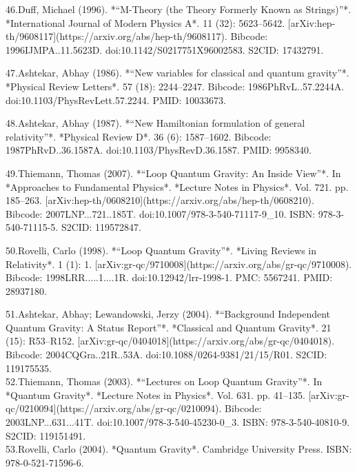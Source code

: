 46.Duff, Michael (1996). *“M-Theory (the Theory Formerly Known as Strings)”*. *International Journal of Modern Physics A*. 11 (32): 5623–5642. [arXiv:hep-th/9608117](https://arxiv.org/abs/hep-th/9608117). Bibcode: 1996IJMPA..11.5623D. doi:10.1142/S0217751X96002583. S2CID: 17432791.

47.Ashtekar, Abhay (1986). *“New variables for classical and quantum gravity”*. *Physical Review Letters*. 57 (18): 2244–2247. Bibcode: 1986PhRvL..57.2244A. doi:10.1103/PhysRevLett.57.2244. PMID: 10033673.

48.Ashtekar, Abhay (1987). *“New Hamiltonian formulation of general relativity”*. *Physical Review D*. 36 (6): 1587–1602. Bibcode: 1987PhRvD..36.1587A. doi:10.1103/PhysRevD.36.1587. PMID: 9958340.

49.Thiemann, Thomas (2007). *“Loop Quantum Gravity: An Inside View”*. In *Approaches to Fundamental Physics*. *Lecture Notes in Physics*. Vol. 721. pp. 185–263. [arXiv:hep-th/0608210](https://arxiv.org/abs/hep-th/0608210). Bibcode: 2007LNP...721..185T. doi:10.1007/978-3-540-71117-9_10. ISBN: 978-3-540-71115-5. S2CID: 119572847.

50.Rovelli, Carlo (1998). *“Loop Quantum Gravity”*. *Living Reviews in Relativity*. 1 (1): 1. [arXiv:gr-qc/9710008](https://arxiv.org/abs/gr-qc/9710008). Bibcode: 1998LRR.....1....1R. doi:10.12942/lrr-1998-1. PMC: 5567241. PMID: 28937180.

51.Ashtekar, Abhay; Lewandowski, Jerzy (2004). *“Background Independent Quantum Gravity: A Status Report”*. *Classical and Quantum Gravity*. 21 (15): R53–R152. [arXiv:gr-qc/0404018](https://arxiv.org/abs/gr-qc/0404018). Bibcode: 2004CQGra..21R..53A. doi:10.1088/0264-9381/21/15/R01. S2CID: 119175535.\\
52.Thiemann, Thomas (2003). *“Lectures on Loop Quantum Gravity”*. In *Quantum Gravity*. *Lecture Notes in Physics*. Vol. 631. pp. 41–135. [arXiv:gr-qc/0210094](https://arxiv.org/abs/gr-qc/0210094). Bibcode: 2003LNP...631...41T. doi:10.1007/978-3-540-45230-0_3. ISBN: 978-3-540-40810-9. S2CID: 119151491.\\
53.Rovelli, Carlo (2004). *Quantum Gravity*. Cambridge University Press. ISBN: 978-0-521-71596-6.\\